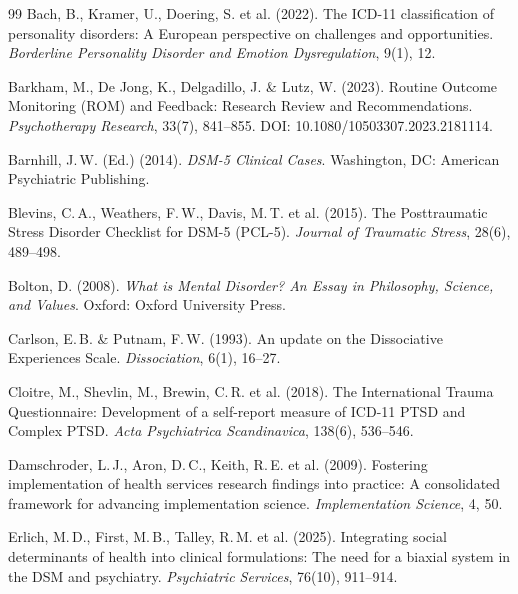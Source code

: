 \documentclass[11pt,a4paper]{article}
\begin{document}
\begin{thebibliography}{99}
Bach, B., Kramer, U., Doering, S. et al. (2022).
\newblock The ICD-11 classification of personality disorders: A European perspective on challenges and opportunities.
\newblock \textit{Borderline Personality Disorder and Emotion Dysregulation}, 9(1), 12.

Barkham, M., De Jong, K., Delgadillo, J. \& Lutz, W. (2023).
\newblock Routine Outcome Monitoring (ROM) and Feedback: Research Review and Recommendations.
\newblock \textit{Psychotherapy Research}, 33(7), 841--855. DOI: 10.1080/10503307.2023.2181114.

Barnhill, J.\,W. (Ed.) (2014).
\newblock \textit{DSM-5 Clinical Cases}.
\newblock Washington, DC: American Psychiatric Publishing.

Blevins, C.\,A., Weathers, F.\,W., Davis, M.\,T. et al. (2015).
\newblock The Posttraumatic Stress Disorder Checklist for DSM-5 (PCL-5).
\newblock \textit{Journal of Traumatic Stress}, 28(6), 489--498.

Bolton, D. (2008).
\newblock \textit{What is Mental Disorder? An Essay in Philosophy, Science, and Values}.
\newblock Oxford: Oxford University Press.

Carlson, E.\,B. \& Putnam, F.\,W. (1993).
\newblock An update on the Dissociative Experiences Scale.
\newblock \textit{Dissociation}, 6(1), 16--27.

Cloitre, M., Shevlin, M., Brewin, C.\,R. et al. (2018).
\newblock The International Trauma Questionnaire: Development of a self-report measure of ICD-11 PTSD and Complex PTSD.
\newblock \textit{Acta Psychiatrica Scandinavica}, 138(6), 536--546.

Damschroder, L.\,J., Aron, D.\,C., Keith, R.\,E. et al. (2009).
\newblock Fostering implementation of health services research findings into practice: A consolidated framework for advancing implementation science.
\newblock \textit{Implementation Science}, 4, 50.

Erlich, M.\,D., First, M.\,B., Talley, R.\,M. et al. (2025).
\newblock Integrating social determinants of health into clinical formulations: The need for a biaxial system in the DSM and psychiatry.
\newblock \textit{Psychiatric Services}, 76(10), 911--914.


\end{thebibliography}
\end{document}
